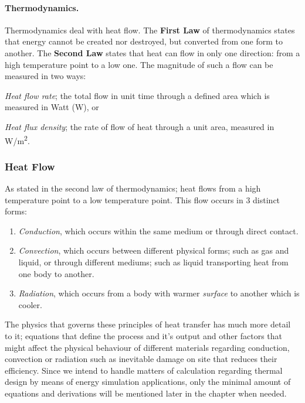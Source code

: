 \paragraph{Thermodynamics.}Thermodynamics deal with heat flow. The \textbf{First Law} of thermodynamics states that energy cannot be created nor destroyed, but converted from one form to another. The \textbf{Second Law} states that heat can flow in only one direction: from a high temperature point to a low one. The magnitude of such a flow can be measured in two ways:
\begin{inparaenum}
  \item \emph{Heat flow rate}; the total flow in unit time through a defined area which is measured in Watt (W), or
  \item \emph{Heat flux density}; the rate of flow of heat through a unit area, measured in W/m\textsuperscript{2}.
\end{inparaenum}

\subsubsection{Heat Flow}
As stated in the second law of thermodynamics; heat flows from a high temperature point to a low temperature point. This flow occurs in 3 distinct forms:
\begin{enumerate}\label{HeatExchange}
  \item \emph{Conduction}, which occurs within the same medium or through direct contact.
  \item \emph{Convection}, which occurs between different physical forms; such as gas and liquid, or through different mediums; such as liquid transporting heat from one body to another.
  \item \emph{Radiation}, which occurs from a body with warmer \emph{surface} to another which is cooler.
 
\end{enumerate}

The physics that governs these principles of heat transfer has much more detail to it; equations that define the process and it's output and other factors that might affect the physical behaviour of different materials regarding conduction, convection or radiation such as inevitable damage on site that reduces their efficiency. Since we intend to handle matters of calculation regarding thermal design by means of energy simulation applications, only the minimal amount of equations and derivations will be mentioned later in the chapter when needed.

